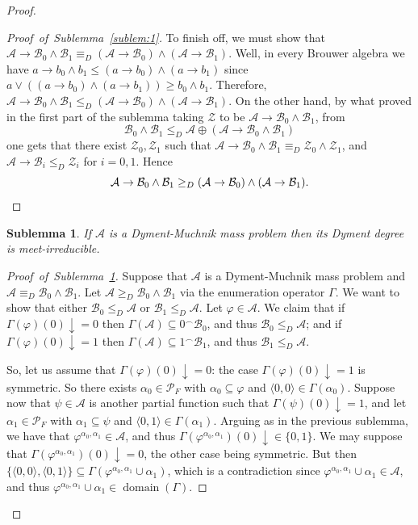 \documentclass[11pt]{amsart}
\renewcommand{\phi}{\varphi}
\newtheorem{sublemma}{Sublemma}
\DeclareMathOperator{\dom}{domain}
\newcommand{\smf}{\smallfrown}
\newcommand{\imp}{\rightarrow}
\newcommand{\meet}{\wedge}
\newcommand{\MP}[1]{\ensuremath{\mathcal{#1}}}
\begin{document}
\begin{proof}
\begin{proof}[Proof~of~Sublemma~\ref{sublem:1}]
To finish off, we must show that $\MP A \imp \MP{B}_0 \meet \MP{B}_1 \equiv_D 
(\MP A \imp \MP{B}_0) \meet (\MP A \imp \MP{B}_1)$. Well, in every Brouwer 
algebra we have $a\rightarrow b_0 \wedge b_1 \leq (a \rightarrow b_0) \wedge 
(a \rightarrow b_1)$ since $a \lor ((a \rightarrow b_0) \wedge (a \rightarrow 
b_1)) \geq b_0 \wedge b_1$. Therefore, $\MP{A} \rightarrow \MP{B}_0 \wedge 
\MP{B}_1 \leq_D (\MP{A} \rightarrow \MP{B}_0) \wedge (\MP{A} \rightarrow 
\MP{B}_1)$. On the other hand, by what proved in the first part of the 
sublemma taking $\mathcal{Z}$ to be $\MP A \imp \MP{B}_0 \meet \MP{B}_1$, 
from 
\[
\mathcal{B}_0 \wedge \mathcal{B}_1\leq_D \mathcal{A} \oplus 
(\mathcal{A} \rightarrow \mathcal{B}_0 \wedge \mathcal{B}_1)
\]
one gets that there exist $\mathcal{Z}_0, \mathcal{Z}_1$ such that $\MP A 
\imp \MP{B}_0 \meet \MP{B}_1 \equiv_D \MP{Z}_0 \meet \MP{Z}_1$, and $\MP{A} 
\rightarrow \MP{B}_i \leq_D \MP{Z}_i$ for $i= 0,1$. Hence 
\[
\MP A \imp \MP{B}_0 \meet \MP{B}_1 \geq_D (\MP A \imp \MP{B}_0) \wedge 
(\MP A \imp \MP{B}_1). \qedhere
\]
\end{proof}

\begin{sublemma}\label{sublem:2}
If $\MP{A}$ is a Dyment-Muchnik mass problem then its Dyment degree is 
meet-irreducible. 
\end{sublemma}

\begin{proof}[Proof~of~Sublemma~\ref{sublem:2}] 
Suppose that $\MP{A}$ is a Dyment-Muchnik mass problem and $\MP{A} \equiv_D 
\MP{B}_0 \wedge \MP{B}_1$. Let $\MP{A} \geq_D \MP{B}_0 \wedge \MP{B}_1$ via 
the enumeration operator $\Gamma$. We want to show that either 
$\MP{B}_0\leq_D \MP{A}$ or $\MP{B}_1\leq_D \MP{A}$. Let $\phi \in \MP{A}$. We 
claim that if $\Gamma(\phi)(0)\downarrow =0$ then $\Gamma(\MP{A}) \subseteq 
0^\smf \MP{B}_0$, and thus $\MP{B}_0 \leq_D \MP{A}$; and if 
$\Gamma(\phi)(0)\downarrow =1$  then $\Gamma(\MP{A}) \subseteq 1^\smf 
\MP{B}_1$, and thus $\MP{B}_1 \leq_D \MP{A}$.  

So, let us assume that $\Gamma(\phi)(0)\downarrow =0$: the case 
$\Gamma(\phi)(0)\downarrow =1$ is symmetric. So there exists $\alpha_0 \in 
\MP{P}_F$ with $\alpha_0 \subseteq \phi$ and $\langle 0, 0 \rangle \in 
\Gamma(\alpha_0)$. Suppose now that $\psi \in \mathcal{A}$ is another partial 
function such that $\Gamma(\psi)(0)\downarrow =1$, and let $\alpha_1 \in 
\MP{P}_F$ with $\alpha_1 \subseteq \psi$ and $\langle 0, 1 \rangle \in 
\Gamma(\alpha_1)$. Arguing as in the previous sublemma, we have that 
$\phi^{\alpha_0, \alpha_1} \in \mathcal{A}$, and thus $\Gamma(\phi^{\alpha_0, 
\alpha_1})(0)\downarrow \in \{0,1\}$. We may suppose that 
$\Gamma(\phi^{\alpha_0, \alpha_1})(0)\downarrow =0$, the other case being 
symmetric. But then $\{\langle 0,0\rangle, \langle 0,1\rangle\} \subseteq 
\Gamma(\phi^{\alpha_0, \alpha_1}\cup \alpha_1)$, which is a contradiction 
since $\phi^{\alpha_0, \alpha_1}\cup \alpha_1 \in \mathcal{A}$, and thus 
$\phi^{\alpha_0, \alpha_1}\cup \alpha_1 \in \dom(\Gamma)$.


\end{proof}
\end{proof}
\end{document}
